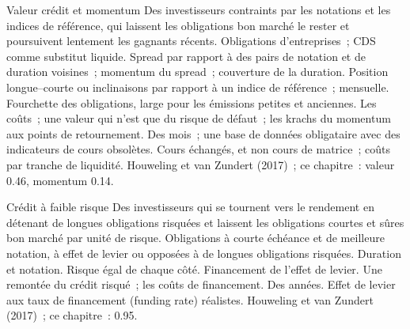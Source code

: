 \begin{strategyfile}{Valeur crédit et momentum}\label{strat:s2:systematic-credit-and-bond-etf-arbitrage:factors}
 Des investisseurs contraints par les notations et les indices de référence, qui laissent les obligations bon marché le rester et poursuivent lentement les gagnants récents.
 Obligations d'entreprises~; CDS comme substitut liquide.
 Spread par rapport à des pairs de notation et de duration voisines~; momentum du spread~; couverture de la duration.
 Position longue--courte ou inclinaisons par rapport à un indice de référence~; mensuelle.
 Fourchette des obligations, large pour les émissions petites et anciennes.
 Les coûts~; une valeur qui n'est que du risque de défaut~; les krachs du momentum aux points de retournement.
 Des mois~; une base de données obligataire avec des indicateurs de cours obsolètes.
 Cours échangés, et non cours de matrice~; coûts par tranche de liquidité.
 Houweling et van Zundert (2017)~; ce chapitre~: valeur 0.46, momentum 0.14.
\end{strategyfile}

\begin{strategyfile}{Crédit à faible risque}\label{strat:s2:systematic-credit-and-bond-etf-arbitrage:lowrisk}
 Des investisseurs qui se tournent vers le rendement en détenant de longues obligations risquées et laissent les obligations courtes et sûres bon marché par unité de risque.
 Obligations à courte échéance et de meilleure notation, à effet de levier ou opposées à de longues obligations risquées.
 Duration et notation.
 Risque égal de chaque côté.
 Financement de l'effet de levier.
 Une remontée du crédit risqué~; les coûts de financement.
 Des années.
 Effet de levier aux taux de financement (funding rate) réalistes.
 Houweling et van Zundert (2017)~; ce chapitre~: 0.95.
\end{strategyfile}

